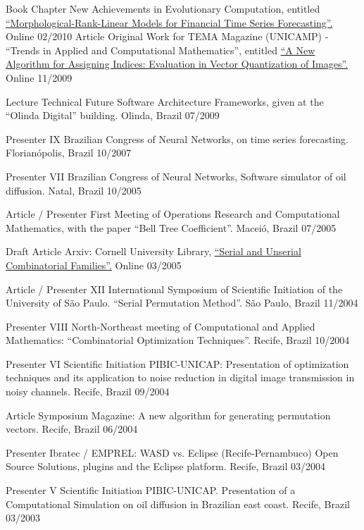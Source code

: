 
\begin{cvhonors}

  \cvhonor
    {Book Chapter}
    {New Achievements in Evolutionary Computation, entitled \href{http://www.intechopen.com/books/new-achievements-in-evolutionary-computation/morphological-rank-linear-models-for-financial-time-series-forecasting}{``Morphological-Rank-Linear Models for Financial Time Series Forecasting''.}}
    {Online}
    {02/2010}
  \cvhonor
    {Article}
    {Original Work for TEMA Magazine (UNICAMP) - ``Trends in Applied and Computational Mathematics'', entitled \href{https://tema.sbmac.org.br/tema/article/view/134/75}{``A New Algorithm for Assigning Indices: Evaluation in Vector Quantization of Images''.}}
    {Online}
    {11/2009}

   \cvhonor
   {Lecture}
   {Technical Future Software Architecture Frameworks, given at the ``Olinda Digital'' building.}
   {Olinda, Brazil}
   {07/2009}

   \cvhonor
   {Presenter}
   {IX Brazilian Congress of Neural Networks, on time series forecasting.}
   {Florianópolis, Brazil}
   {10/2007}

   \cvhonor
   {Presenter}
   {VII Brazilian Congress of Neural Networks, Software simulator of oil diffusion.}
   {Natal, Brazil}
   {10/2005}

   \cvhonor
   {Article / Presenter}
   {First Meeting of Operations Research and Computational Mathematics, with the paper ``Bell Tree Coefficient''.}
   {Maceió, Brazil}
   {07/2005}

   \cvhonor
   {Draft Article}
   {Arxiv: Cornell University Library, \href{http://arxiv.org/pdf/math/0503335v1.pdf}{``Serial and Unserial Combinatorial Families''.}}
   {Online}
   {03/2005}

   \cvhonor
   {Article / Presenter}
   {XII International Symposium of Scientific Initiation of the University of São Paulo. ``Serial Permutation Method''.}
   {São Paulo, Brazil}
   {11/2004}

   \cvhonor
   {Presenter}
   {VIII North-Northeast meeting of Computational and Applied Mathematics: ``Combinatorial Optimization Techniques''.}
   {Recife, Brazil}
   {10/2004}

   \cvhonor
   {Presenter}
   {VI Scientific Initiation PIBIC-UNICAP: Presentation of optimization techniques and its application to noise reduction in digital image transmission in noisy channels.}
   {Recife, Brazil}
   {09/2004}

   \cvhonor
   {Article}
   {Symposium Magazine: A new algorithm for generating permutation vectors.}
   {Recife, Brazil}
   {06/2004}

   \cvhonor
   {Presenter}
   {Ibratec / EMPREL: WASD vs. Eclipse (Recife-Pernambuco) Open Source Solutions, plugins and the Eclipse platform.}
   {Recife, Brazil}
   {03/2004}

   \cvhonor
   {Presenter}
   {V Scientific Initiation PIBIC-UNICAP. Presentation of a Computational Simulation on oil diffusion in Brazilian east coast.}
   {Recife, Brazil}
   {03/2003}

\end{cvhonors}
